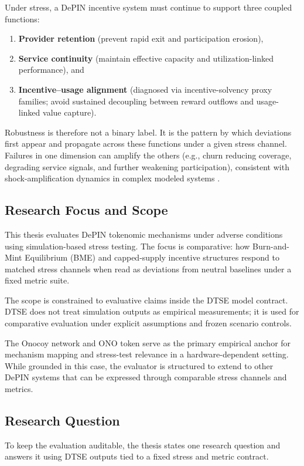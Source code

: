 Under stress, a DePIN incentive system must continue to support three coupled functions:
\begin{enumerate}
    \item \textbf{Provider retention} (prevent rapid exit and participation erosion),
    \item \textbf{Service continuity} (maintain effective capacity and utilization-linked performance), and
    \item \textbf{Incentive--usage alignment} (diagnosed via incentive-solvency proxy families; avoid sustained decoupling between reward outflows and usage-linked value capture).
\end{enumerate}
Robustness is therefore not a binary label. It is the pattern by which deviations first appear and propagate across these functions under a given stress channel. Failures in one dimension can amplify the others (e.g., churn reducing coverage, degrading service signals, and further weakening participation), consistent with shock-amplification dynamics in complex modeled systems \cite{Morris2019, Braakman2022}.

\subsection{Research Focus and Scope}
This thesis evaluates DePIN tokenomic mechanisms under adverse conditions using simulation-based stress testing. The focus is comparative: how Burn-and-Mint Equilibrium (BME) and capped-supply incentive structures respond to matched stress channels when read as deviations from neutral baselines under a fixed metric suite.

The scope is constrained to evaluative claims inside the DTSE model contract. DTSE does not treat simulation outputs as empirical measurements; it is used for comparative evaluation under explicit assumptions and frozen scenario controls.

The Onocoy network and ONO token serve as the primary empirical anchor for mechanism mapping and stress-test relevance in a hardware-dependent setting. While grounded in this case, the evaluator is structured to extend to other DePIN systems that can be expressed through comparable stress channels and metrics.

\subsection{Research Question}
\label{subsec:research_question}
To keep the evaluation auditable, the thesis states one research question and answers it using DTSE outputs tied to a fixed stress and metric contract.

